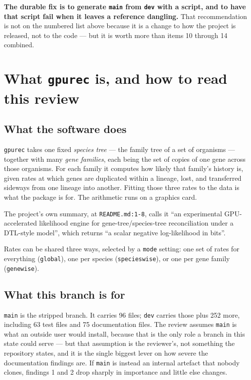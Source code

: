 \documentclass[11pt]{article}
\newcommand{\loc}[1]{\nolinkurl{#1}}
\begin{document}
\textbf{The durable fix is to generate \texttt{main} from \texttt{dev} with a
script, and to have that script fail when it leaves a reference dangling.}  That
recommendation is not on the numbered list above because it is a change to how
the project is released, not to the code --- but it is worth more than items 10
through 14 combined.

\section{What \texttt{gpurec} is, and how to read this review}

\subsection{What the software does}

\texttt{gpurec} takes one fixed \emph{species tree} --- the family tree of a set
of organisms --- together with many \emph{gene families}, each being the set of
copies of one gene across those organisms.  For each family it computes how
likely that family's history is, given rates at which genes are duplicated
within a lineage, lost, and transferred sideways from one lineage into another.
Fitting those three rates to the data is what the package is for.  The
arithmetic runs on a graphics card.

The project's own summary, at \loc{README.md:1-8}, calls it ``an experimental
GPU-accelerated likelihood engine for gene-tree/species-tree reconciliation
under a DTL-style model'', which returns ``a scalar negative log-likelihood in
bits''.

Rates can be shared three ways, selected by a \texttt{mode} setting: one set of
rates for everything (\texttt{global}), one per species (\texttt{specieswise}),
or one per gene family (\texttt{genewise}).

\subsection{What this branch is for}

\texttt{main} is the stripped branch.  It carries 96 files; \texttt{dev} carries
those plus 252 more, including 63 test files and 75 documentation files.  The
review assumes \texttt{main} is what an outside user would install, because that
is the only role a branch in this state could serve --- but that assumption is
the reviewer's, not something the repository states, and it is the single
biggest lever on how severe the documentation findings are.  If \texttt{main} is
instead an internal artefact that nobody clones, findings 1 and 2 drop sharply
in importance and little else changes.
\end{document}
